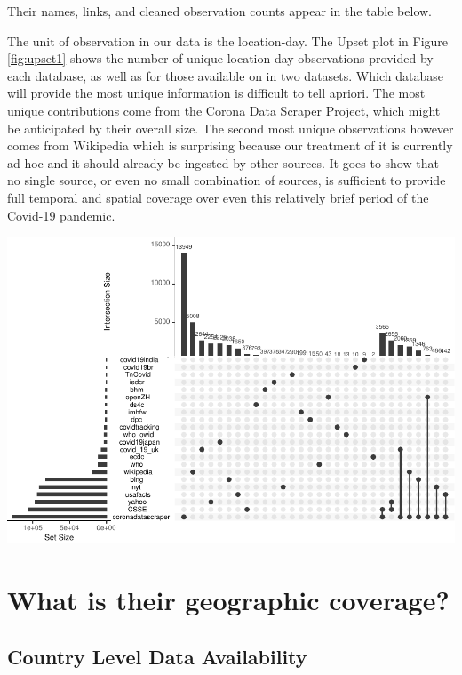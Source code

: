 \documentclass[
]{book}
\begin{document}
Their names, links, and cleaned observation counts appear in the table below.

\hypertarget{htmlwidget-2ac2615561d17ac70794}{}

The unit of observation in our data is the location-day. The Upset plot in Figure \ref{fig:upset1} shows the number of unique location-day observations provided by each database, as well as for those available on in two datasets. Which database will provide the most unique information is difficult to tell apriori. The most unique contributions come from the Corona Data Scraper Project, which might be anticipated by their overall size. The second most unique observations however comes from Wikipedia which is surprising because our treatment of it is currently ad hoc and it should already be ingested by other sources. It goes to show that no single source, or even no small combination of sources, is sufficient to provide full temporal and spatial coverage over even this relatively brief period of the Covid-19 pandemic.

\begin{center}\includegraphics[width=1\linewidth]{HowToBeCarefulWithCovid19Counts_files/figure-latex/upset1-1} \end{center}

\hypertarget{what-is-their-geographic-coverage}{%
\section{What is their geographic coverage?}\label{what-is-their-geographic-coverage}}

\hypertarget{country-level-data-availability}{%
\subsection{Country Level Data Availability}\label{country-level-data-availability}}
\end{document}
